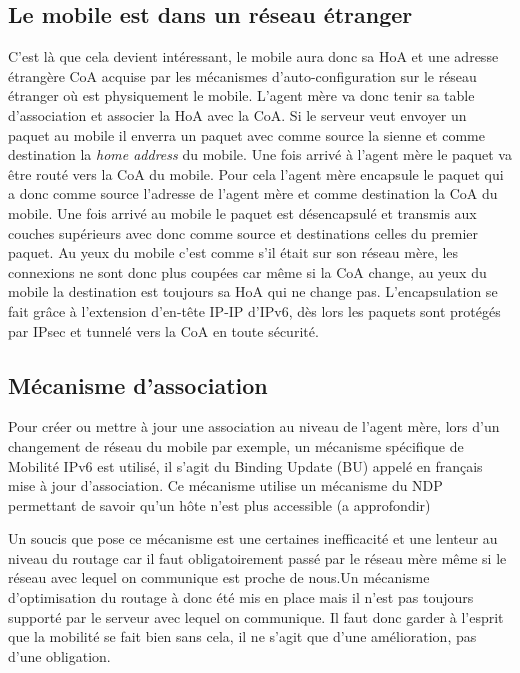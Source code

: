 
\subsection{Le mobile est dans un réseau étranger}

C’est là que cela devient intéressant, le mobile aura donc sa HoA et une adresse étrangère CoA acquise par les mécanismes d’auto-configuration sur le réseau étranger où est physiquement le mobile. L’agent mère va donc tenir sa table d’association et associer la HoA avec la CoA. Si le serveur veut envoyer un paquet au mobile il enverra un paquet avec comme source la sienne et comme destination la \emph{home address} du mobile. Une fois arrivé à l’agent mère le paquet va être routé vers la CoA du mobile. Pour cela l’agent mère encapsule le paquet qui a donc comme source l’adresse de l’agent mère et comme destination la CoA du mobile. Une fois arrivé au mobile le paquet est désencapsulé et transmis aux couches supérieurs avec donc comme source et destinations celles du premier paquet. Au yeux du mobile c’est comme s’il était sur son réseau mère, les connexions ne sont donc plus coupées car même si la CoA change, au yeux du mobile la destination est toujours sa HoA qui ne change pas. L’encapsulation se fait grâce à l’extension d’en-tête IP-IP d’IPv6, dès lors les paquets sont protégés par IPsec et tunnelé vers la CoA en toute sécurité.


\subsection{Mécanisme d’association}

Pour créer ou mettre à jour une association au niveau de l’agent mère, lors d’un changement de réseau du mobile par exemple, un mécanisme spécifique de Mobilité IPv6 est utilisé, il s’agit du Binding Update (BU) appelé en français mise à jour d’association. Ce mécanisme utilise un mécanisme du NDP permettant de savoir qu’un hôte n’est plus accessible (a approfondir)


Un soucis que pose ce mécanisme est une certaines inefficacité et une lenteur au niveau du routage car il faut obligatoirement passé par le réseau mère même si le réseau avec lequel on communique est proche de nous.Un mécanisme d’optimisation du routage à donc été mis en place mais il n’est pas toujours supporté par le serveur avec lequel on communique. Il faut donc garder à l’esprit que la mobilité se fait bien sans cela, il ne s’agit que d’une amélioration, pas d’une obligation.


